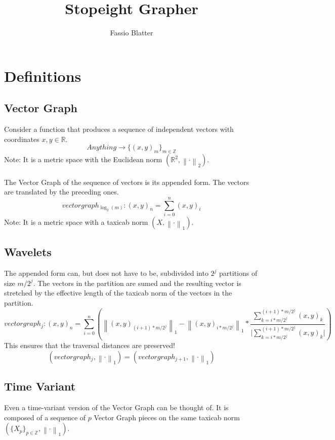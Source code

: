 \documentclass{report}
\newcommand\norm[1]{\left\lVert#1\right\rVert}
\begin{document}
\title{Stopeight Grapher}
\author{Fassio Blatter}
\maketitle

\chapter{Definitions}
\section{Vector Graph}
Consider a function that produces a sequence of independent vectors with coordinates $x,y \in \mathbb{R}$.
\begin{equation}
Anything \rightarrow \{(x,y)_{m}\}_{m \in \mathbb{Z}}
\end{equation}
Note: It is a metric space with the Euclidean norm $(\mathbb{R}^2,\norm{\cdot}_2)$.\\\\
The Vector Graph of the sequence of vectors is its appended form. The vectors are translated by the preceding ones.\\
\begin{equation}
vectorgraph_{\log_{2}(m)}: (x,y)_{n}=\sum_{i=0}^{n} (x,y)_{i}
\end{equation}
Note: It is a metric space with a taxicab norm $(X,\norm{\cdot}_1)$.
\section{Wavelets}
The appended form can, but does not have to be, subdivided into $2^j$ partitions of size $m/2^j$. The vectors in the partition are sumed and the resulting vector is stretched by the effective length of the taxicab norm of the vectors in the partition.
\begin{equation}
vectorgraph_{j}:(x,y)_{n}=\sum_{i=0}^{n} (\norm{(x,y)_{(i+1)*m/2^j}}_{1} - \norm{(x,y)_{i*m/2^j}}_{1} * \frac{\sum_{k=i*m/2^j}^{(i+1)*m/2^j} (x,y)_{k}}{\vert \sum_{k=i*m/2^j}^{(i+1)*m/2^j} (x,y)_{k} \vert})
\end{equation}
This ensures that the traversal distances are preserved!
\begin{equation}
(vectorgraph_{j},\norm{\cdot}_{1})=(vectorgraph_{j+1},\norm{\cdot}_{1})
\end{equation}
\section{Time Variant}
Even a time-variant version of the Vector Graph can be thought of. It is composed of a sequence of $p$ Vector Graph pieces on the same taxicab norm $(\{X_{p}\}_{p\in \mathbb{Z}},\norm{\cdot}_1)$.
\end{document}
